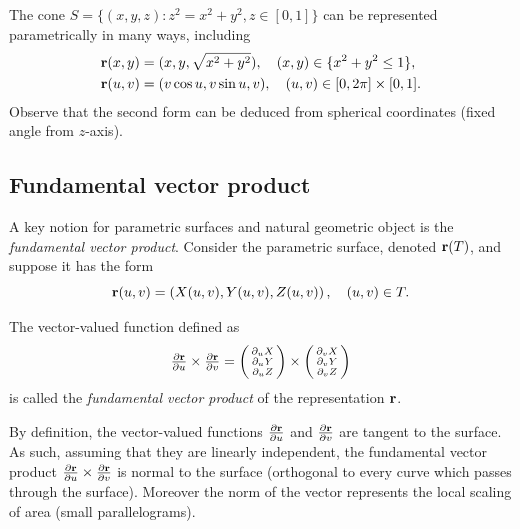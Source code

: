 \begin{example*}[cone]
    The cone \(S = \{(x,y,z): z^2 = x^2+y^2, z\in [0,1]\}\) can be represented parametrically in many ways, including
    \[
        \begin{aligned}
            \mathbf{r}(x,y) & =(x,y,{\sqrt{x^2+y^2}}), \quad (x,y)\in\{x^2+y^2 \leq 1\},         \\
            \mathbf{r}(u,v) & =(v \cos u, v \sin u, {v}), \quad (u,v)\in  [0,2\pi] \times [0,1].
        \end{aligned}
    \]
    Observe that the second form can be deduced from spherical coordinates (fixed angle from \(z\)-axis).
\end{example*}

\subsection*{Fundamental vector product}
A key notion for parametric surfaces and natural geometric object is the \emph{fundamental vector product}.
Consider the parametric surface, denoted \(\mathbf{r}(T)\), and suppose it has the form
\[
    \mathbf{r}(u,v) = \left(X(u,v),Y(u,v),Z(u,v)\right),
    \quad (u,v)\in T.
\]

\begin{definition}
    The vector-valued function defined as
    \[
        \tfrac{\partial \mathbf{r}}{\partial u} \times \tfrac{\partial \mathbf{r}}{\partial v}
        = \left(\begin{smallmatrix}
                \partial_{u} X \\ \partial_{u} Y \\ \partial_{u} Z
            \end{smallmatrix}\right)
        \times
        \left(\begin{smallmatrix}
                \partial_{v} X \\ \partial_{v} Y \\ \partial_{v} Z
            \end{smallmatrix}\right)
    \]
    is called the \emph{fundamental vector product} of the representation \(\mathbf{r}\).
\end{definition}

By definition, the vector-valued functions \(\frac{\partial \mathbf{r}}{\partial u}\) and \(\frac{\partial \mathbf{r}}{\partial v}\) are tangent to the surface.
As such, assuming that they are linearly independent, the fundamental vector product \(\frac{\partial \mathbf{r}}{\partial u} \times \frac{\partial \mathbf{r}}{\partial v}\) is normal to the surface (orthogonal to every curve which passes through the surface).
Moreover the norm of the vector represents the local scaling of area (small parallelograms).

